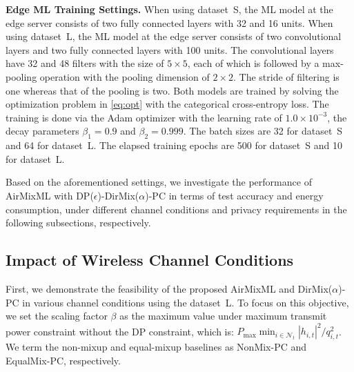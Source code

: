 \documentclass[conference,10pt]{IEEEtran}
\theoremstyle{definition}
\theoremstyle{definition}
\begin{document}
\vspace{.3em}\noindent\textbf{Edge ML Training Settings.}\quad
When using dataset~S, the ML model at the edge server consists of two fully connected layers with 32 and 16 units.
When using dataset~L, the ML model at the edge server consists of two convolutional layers and two fully connected layers with 100 units.
The convolutional layers have 32 and 48 filters with the size of $5\times 5$, each of which is followed by a max-pooling operation with the pooling dimension of $2\times 2$.
The stride of filtering is one whereas that of the pooling is two.
Both models are trained by solving the optimization problem in \eqref{eq:opt} with the categorical cross-entropy loss.
The training is done via the Adam optimizer\cite{sutskever2013importance} with the learning rate of $1.0\times 10^{-3}$, the decay parameters $\beta_1 = 0.9$ and $\beta_2 = 0.999$.
The batch sizes are 32 for dataset~S and 64 for dataset~L.
The elapsed training epochs are 500 for dataset~S and 10 for dataset~L.

Based on the aforementioned settings, we investigate the performance of AirMixML with \textsf{DP($\epsilon$)-DirMix($\alpha$)-PC} in terms of test accuracy and energy consumption, under different channel conditions and privacy requirements in the following subsections, respectively.

\vspace{-.5em}
\subsection{Impact of Wireless Channel Conditions}

First, we demonstrate the feasibility of the proposed AirMixML and \textsf{DirMix($\alpha$)-PC} in various channel conditions using the dataset~L.
To focus on this objective, we set the scaling factor $\beta$ as the maximum value under maximum transmit power constraint without the DP constraint, which is: $P_{\mathrm{max}}\min_{i\in \mathcal{N}_t}{|h_{i, t}|^2}/{q_{i, t}^2}$.
We term the non-mixup and equal-mixup baselines as \textsf{NonMix-PC} and \textsf{EqualMix-PC}, respectively.
\end{document}
